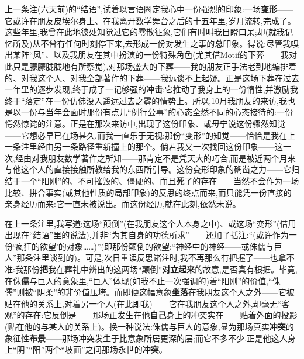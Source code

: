 上一条注(六天前)的“结语”,试着以言语圈定我心中一份强烈的印象:一场\textbf{变形}——它或许在朋友皮埃尔身上、在我离开数学舞台之后的十五年里,岁月流转,完成了。这些年里,我曾在此地彼处知觉过它的零散征象,它们有时叫我目瞪口呆;却(就我记忆所及)从不曾有任何时刻停下来,去形成一份对发生之事的\textbf{总}印象。得说:尽管我嗅出某阵“风”、以及我朋友在其中扮演的一份特殊角色(尤其借Motif的下葬——我对此只是朦朦胧胧地有所察觉),对那场盛大的下葬——我的朋友\dmark{}正手法老到地编排着的、对我这个人、对我全部著作的下葬——我远谈不上起疑。正是这场下葬在过去一年里的逐步发现,终于成了一记够强的\textbf{冲击}:它推动了我身上的一份惰性,并激励我终于“落定”在一份仿佛没入遥远过去之雾的情势上。所以,10月我朋友的来访,我也是以一份与当年会面时那份有点儿“例行公事”的心态全然不同的心态接待的:一份愕然惊诧的注意。正是在那次来访中,出现了这份印象、或毋宁说这份骤然知觉——它想必早已在场甚久,而我一直乐于无视:那份“变形”的知觉——恰恰是我在上一条注里经由另一条路径重新撞上的那个。倘若我又一次找回这份印象——这一次,经由对我朋友数学著作之所知——那肯定不是凭天大的巧合,而是被近两个月来与他这个人的直接接触所教给我的东西所引导。这份变形印象的确凿之力——它归结于一个“阳刚”的、不可摧毁的、僵硬的、而且\textbf{死}了的存在——当然不会作为一场比较、拼合事实(或其他性质的局部印象)的反思的终点而来,而只能凭一份直接的亲身经历而来:它一直未被说出。而这份经历,就在此刻,依然未说。

在上一条注里,我写道:这场“颠倒”(在我朋友这个人本身之中)、或这场“变形”(借用出现在“结语”里的说法\dmark{}),并非“为其自身的功德所求”——还加了括注:“(或许作为一份‘疯狂的欲望’的对象……)”(即那份颠倒的欲望:“神经中的神经——或侏儒与巨人”那条注里谈到的)。可是,次日重读反思诸注时,我不再那么有把握了——也拿不准:我那份\textbf{把}我在葬礼中辨出的这两场“颠倒”\textbf{对立起来}的故意,是否真有根据。毕竟,在侏儒与巨人的意象里,“巨人”体现(如我不止一次强调的)着“阳刚”的价值,“侏儒”则被“阴柔”的非价值压垮。而即便这幅意象\textbf{坐落}在我朋友这个人之外——它被贴在他的关系上,对着另一个人(在此即我)——它在我朋友这个人之外,却毫无“客观”的存在:它反倒是——那场正发生在他\textbf{自己}身上的冲突实在——贴着外面的投影(贴在他的与某人的关系上)。换一种说法:侏儒与巨人的意象,显为那场真实\textbf{冲突}的象征性\textbf{布景}——那场冲突发生于比意象所居更深的层;而它不多不少,正是他这人身上“阴”“阳”两个“坡面”之间那场永世的\textbf{冲突}。

